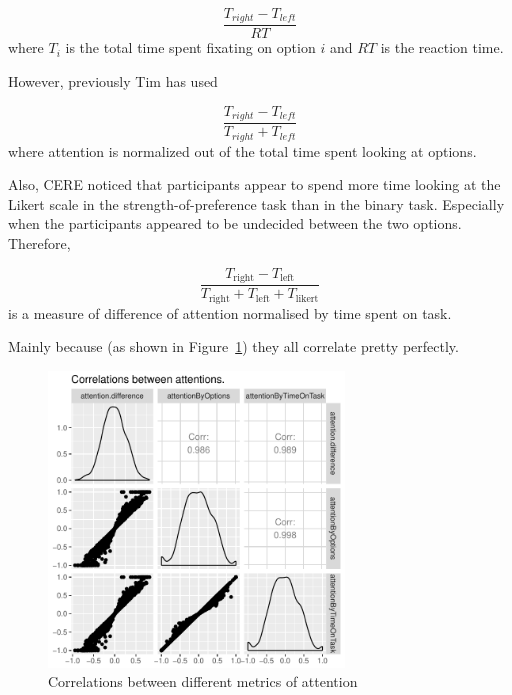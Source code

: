 \documentclass[12pt]{article}
\begin{document}
\begin{equation}
	\frac{T_{right}-T_{left}}{RT}	
\end{equation}
where $T_i$ is the total time spent fixating on option $i$ and $RT$ is the reaction time. 

However, previously Tim has used

\begin{equation}
	\frac{T_{right}-T_{left}}{T_{right}+T_{left}}
\end{equation}
where attention is normalized out of the total time spent looking at options. 

Also, CERE noticed that participants appear to spend more time looking at the Likert scale in the strength-of-preference task than in the binary task. Especially when the participants appeared to be undecided between the two options. Therefore, 

\begin{equation}
	\frac{T_\text{right}-T_\text{left}}{T_\text{right}+T_\text{left}+T_\text{likert}}
\end{equation}
is a measure of difference of attention normalised by time spent on task. 




Mainly because (as shown in Figure~\ref{figure:attentionCorrelations}) they all correlate pretty perfectly. 

\begin{figure}
	\centering
	\includegraphics[width=0.7\textwidth]{images/attentionCorrelations}
	\caption{Correlations between different metrics of attention}
	\label{figure:attentionCorrelations}
\end{figure}
\end{document}
